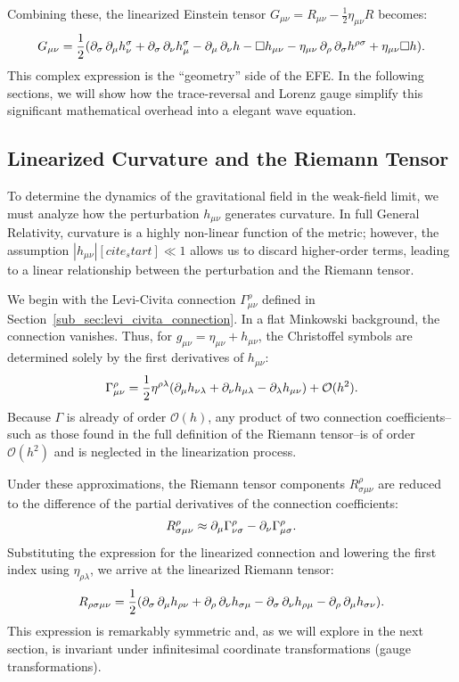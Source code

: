 Combining these, the linearized Einstein tensor $G_{\mu\nu} = R_{\mu\nu} - \frac{1}{2}\eta_{\mu\nu}R$ becomes:
\[%
  G_{\mu\nu} = \frac{1}{2}(\pd{\sigma}\pd{\mu}h^{\sigma}_{\nu} + \pd{\sigma}\pd{\nu}h^{\sigma}_{\mu} - \pd{\mu}\pd{\nu}h - \Box h_{\mu\nu} - \eta_{\mu\nu}\pd{\rho}\pd{\sigma}h^{\rho\sigma} + \eta_{\mu\nu}\Box h)
.\]%
This complex expression is the ``geometry'' side of the EFE. In the following sections, we will show how the trace-reversal and Lorenz gauge simplify this significant mathematical overhead into a elegant wave equation.

\subsection{Linearized Curvature and the Riemann Tensor} To determine the dynamics of the gravitational field in the weak-field limit, we must analyze how the perturbation $h_{\mu\nu}$ generates curvature. In full General Relativity, curvature is a highly non-linear function of the metric; however, the assumption $|h_{\mu\nu}| [cite_start]\ll 1$ allows us to discard higher-order terms, leading to a linear relationship between the perturbation and the Riemann tensor.

We begin with the Levi-Civita connection $\Gamma^{\rho}_{\mu\nu}$ defined in Section~\ref{sub_sec:levi_civita_connection}. In a flat Minkowski background, the connection vanishes. Thus, for $g_{\mu\nu} = \eta_{\mu\nu} + h_{\mu\nu}$, the Christoffel symbols are determined solely by the first derivatives of $h_{\mu\nu}$:
\[%
  \Gamma^{\rho}_{\mu\nu} = \frac{1}{2}\eta^{\rho\lambda}(\pd{\mu}h_{\nu\lambda} + \pd{\nu}h_{\mu\lambda} - \pd{\lambda}h_{\mu\nu}) + \mathcal{O}(h^2)
.\]%
Because $\Gamma$ is already of order $\mathcal{O}(h)$, any product of two connection coefficients--such as those found in the full definition of the Riemann tensor--is of order $\mathcal{O}(h^2)$ and is neglected in the linearization process.

Under these approximations, the Riemann tensor components $R^{\rho}_{\sigma\mu\nu}$ are reduced to the difference of the partial derivatives of the connection coefficients:
\[%
  R^{\rho}_{\sigma\mu\nu} \approx \pd{\mu}\Gamma^{\rho}_{\nu\sigma} - \pd{\nu}\Gamma^{\rho}_{\mu\sigma}
.\]%
Substituting the expression for the linearized connection and lowering the first index using $\eta_{\rho\lambda}$, we arrive at the linearized Riemann tensor:
\[%
  R_{\rho\sigma\mu\nu} = \frac{1}{2}(\pd{\sigma}\pd{\mu}h_{\rho\nu} + \pd{\rho}\pd{\nu}h_{\sigma\mu} - \pd{\sigma}\pd{\nu}h_{\rho\mu} - \pd{\rho}\pd{\mu}h_{\sigma\nu})
.\]%
This expression is remarkably symmetric and, as we will explore in the next section, is invariant under infinitesimal coordinate transformations (gauge transformations).

